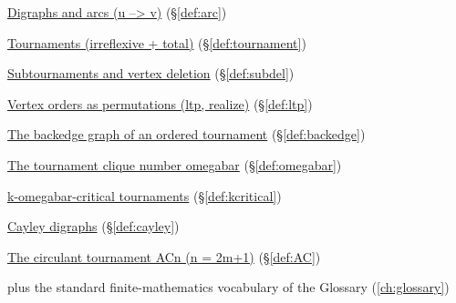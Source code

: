 \begin{closurepanel}
\item \hyperref[def:arc]{Digraphs and arcs (u --> v)} (\S\ref*{def:arc})
\item \hyperref[def:tournament]{Tournaments (irreflexive + total)} (\S\ref*{def:tournament})
\item \hyperref[def:subdel]{Subtournaments and vertex deletion} (\S\ref*{def:subdel})
\item \hyperref[def:ltp]{Vertex orders as permutations (ltp, realize)} (\S\ref*{def:ltp})
\item \hyperref[def:backedge]{The backedge graph of an ordered tournament} (\S\ref*{def:backedge})
\item \hyperref[def:omegabar]{The tournament clique number omegabar} (\S\ref*{def:omegabar})
\item \hyperref[def:kcritical]{k-omegabar-critical tournaments} (\S\ref*{def:kcritical})
\item \hyperref[def:cayley]{Cayley digraphs} (\S\ref*{def:cayley})
\item \hyperref[def:AC]{The circulant tournament ACn (n = 2m+1)} (\S\ref*{def:AC})
\item plus the standard finite-mathematics vocabulary of the Glossary (\cref{ch:glossary})
\end{closurepanel}

